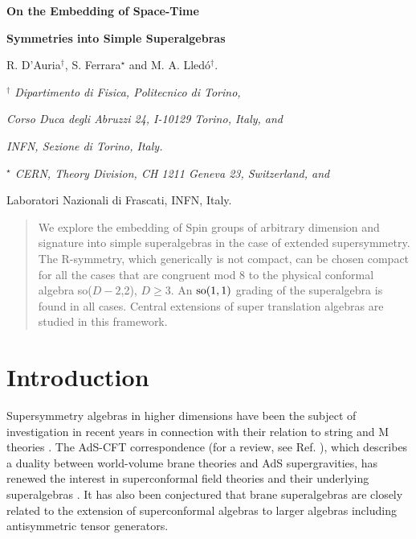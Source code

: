 \documentclass[a4paper,12pt]{article}
\begin{document}
\newcommand{\Z}{\mathbb{Z}}
\newcommand{\R}{\mathbb{R}}
\newcommand{\C}{\mathbb{C}}
\newcommand{\g}{\mathcal{G}}
\newcommand{\s}{\mathcal{S}}
\newcommand{\ka}{\mathcal{K}}
\newcommand{\p}{\mathcal{P}}
\newcommand{\A}{\mathcal{A}}
\newcommand{\I}{\mathcal{I}}
\newcommand{\Ca}{\mathcal{C}}
\newcommand{\N}{\mathbb{N}}
\newcommand{\La}{\mathcal{L}}
\newcommand{\Ha}{\mathbb{H}}

\vskip 2cm


  \centerline{\LARGE \bf On the Embedding of Space-Time }

  \smallskip

\centerline{\LARGE \bf Symmetries into Simple Superalgebras}
\vskip 3cm \centerline{ R. D'Auria$^\dagger$, S. Ferrara$^\star$
and M. A. Lled\'o$^\dagger$.}

\vskip 2cm


\centerline{\it $^\dagger$ Dipartimento di Fisica, Politecnico di
Torino,} \centerline{\it Corso Duca degli Abruzzi 24, I-10129
Torino, Italy, and} \centerline{\it INFN, Sezione di Torino,
Italy.}
 \medskip

\centerline{\it $^\star$ CERN, Theory Division, CH 1211 Geneva 23,
Switzerland, and } \centerline{Laboratori Nazionali di Frascati,
INFN, Italy.}



\vskip 2cm

\begin{abstract}
We explore the embedding of Spin groups of arbitrary dimension and
signature into simple superalgebras in the case of extended
supersymmetry. The R-symmetry, which generically is not compact,
can be chosen compact for all the cases that are congruent mod 8
to the physical conformal algebra so($D-2$,2), $D\geq 3$. An
$\rm{so}(1,1)$ grading of the superalgebra is found in all cases.
Central extensions of super translation algebras are studied in
this framework.



\end{abstract}

\vfill\eject

\section{Introduction}

Supersymmetry algebras in higher dimensions \cite{na,st} have been
the subject of investigation in recent years in connection with
their relation to string and M theories \cite{hw}. The AdS-CFT
correspondence (for a review, see Ref. \cite{agmoo}), which
describes a duality between world-volume brane theories and AdS
supergravities, has renewed the interest in superconformal field
theories and their underlying superalgebras \cite{to, gu, fp, vp}.
It has also been conjectured \cite{hw, to, gu, fp, ba, ho} that
brane superalgebras are closely related to the extension of
superconformal algebras to larger algebras including antisymmetric
tensor generators.
\end{document}

